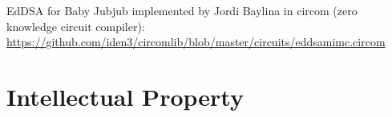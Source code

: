 \documentclass{article}
\begin{document}
\begin{spacing}{1.2}
	EdDSA for Baby Jubjub implemented by Jordi Baylina in circom (zero knowledge circuit compiler):\\ \url{https://github.com/iden3/circomlib/blob/master/circuits/eddsamimc.circom}

\section {Intellectual Property}





\end{spacing}
\end{document}
